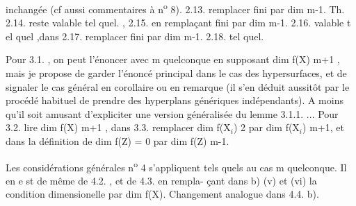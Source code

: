 
inchangée (cf aussi  commentaires à n\textsuperscript{o} 8). 2.13. remplacer fini
par dim \hand{$\leqslant$} m-1. Th. 2.14. reste valable tel quel. , 2.15. en
remplaçant fini par dim \hand{$\leqslant$} m-1. 2.16. valable t el quel ,dans
 2.17. remplacer fini par dim \hand{$\leqslant$} m-1. 2.18. tel quel.

Pour 3.1. , on peut l'énoncer avec m quelconque en supposant
dim f(X) \hand{$\geqslant$} m+1 , mais je propose de garder l'énoncé principal dans
le cas des hypersurfaces, et de signaler le cas général en corollaire
ou en remarque (il s'en déduit aussitôt par le procédé habituel de
prendre des hyperplans génériques indépendants). A moins qu'il soit
amusant d'expliciter une version généralisée du lemme 3.1.1. ...
Pour 3.2. lire dim f(X)\hand{$\geqslant$} m+1 , dans 3.3. remplacer dim f(X$_i$) \hand{$\geqslant$} 2
par dim f(X$_i$)\hand{$\geqslant$} m+1, et dans la définition de  dim f(Z) = 0
par dim f(Z) \hand{$\leqslant$} m-1.

Les considérations générales  n\textsuperscript{o} 4 s'appliquent tels quels
au cas m quelconque. Il en e st de même de 4.2. , et de 4.3. en rempla-%
çant dans b) (v) et (vi) la condition dimensionelle par
dim f(X). Changement analogue dans 4.4. b).

